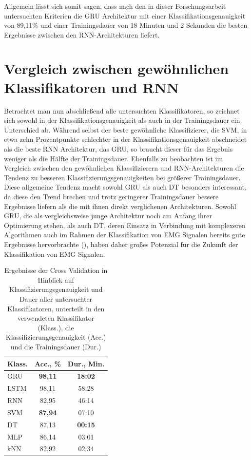 Allgemein lässt sich somit sagen, dass nach den in dieser Forschungsarbeit untersuchten Kriterien die GRU Architektur mit einer Klassifikationsgenauigkeit von 89,11\% und einer Trainingsdauer von 18 Minuten und 2 Sekunden die besten Ergebnisse zwischen den RNN-Architekturen liefert.

\section{Vergleich zwischen gewöhnlichen Klassifikatoren und RNN}
\label{subsec:rnn-other-comp}

Betrachtet man nun abschließend alle untersuchten Klassifikatoren, so zeichnet sich sowohl in der Klassifikationsgenauigkeit als auch in der Trainingsdauer ein Unterschied ab. Während selbst der beste gewöhnliche Klassifizierer, die SVM, in etwa zehn Prozentpunkte schlechter in der Klassifikationsgenauigkeit abschneidet als die beste RNN Architektur, das GRU, so braucht dieser für das Ergebnis weniger als die Hälfte der Trainingsdauer. Ebenfalls zu beobachten ist im Vergleich zwischen den gewöhnlichen Klassifizierern und RNN-Architekturen die Tendenz zu besseren Klassifizierungsgenauigkeiten bei größerer Trainingsdauer. Diese allgemeine Tendenz macht sowohl GRU als auch DT besonders interessant, da diese den Trend brechen und trotz geringerer Trainingsdauer bessere Ergebnisse liefern als die mit ihnen direkt verglichenen Architekturen. Sowohl GRU, die als vergleichsweise junge Architektur noch am Anfang ihrer Optimierung stehen, als auch DT, deren Einsatz in Verbindung mit komplexeren Algorithmen auch im Rahmen der Klassifikation von EMG Signalen bereits gute Ergebnisse hervorbrachte (\cite{gokgoz2015comparison}), haben daher großes Potenzial für die Zukunft der Klassifikation von EMG Signalen.

\begin{table}[h]
    \centering
    \bgroup
    \begin{tabular}{| l | c | c |}
        \hline
        \textbf{Klass.} & \textbf{Acc., \%} & \textbf{Dur., Min.} \\
        \hline
        GRU & \textbf{98,11} & \textbf{18:02}\\ \hline
        LSTM & 98,11 & 58:28 \\ \hline
        RNN & 82,95 & 46:14 \\
        \hline
        \hline
        SVM & \textbf{87,94} & 07:10 \\ \hline
        DT & 87,13 & \textbf{00:15 }\\ \hline
        MLP & 86,14 & 03:01 \\ \hline
        kNN & 82,92 & 02:34 \\
        \hline
    \end{tabular}
    \egroup
    \caption{Ergebnisse der Cross Validation in Hinblick auf Klassifizierungsgenauigkeit und Dauer aller untersuchter Klassifikatoren, unterteilt in den verwendeten Klassifikator (Klass.), die Klassifizierungsgenauigkeit (Acc.) und die Trainingsdauer (Dur.)}
    \label{tab:rnn-comp}
\end{table}

